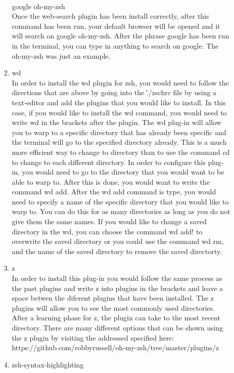 \documentclass{article}
\begin{document}
\begin{enumerate}
\begin{enumerate}
\begin{enumerate}
\\
google oh-my-zsh
\\
Once the web-search plugin has been install correctly, after this command has been run, your default browser will be opened and it will search on google oh-my-zsh. After the phrase google has been run in the terminal, you can type in anything to search on google. The oh-my-zsh was just an example.
\\
\item wd
\\
In order to install the wd plugin for zsh, you would need to follow the directions that are above by going into the \~./zschrc file by using a text-editor and add the plugins that you would like to install. In this case, if you would like to install the wd command, you would need to write wd in the brackets after the plugin. The wd plug-in will allow you to warp to a specific directory that has already been specific and the terminal will go to the specified directory already. This is a much more efficient way to change to directory than to use the command cd to change to each different directory. In order to configure this plug-in, you would need to go to the directory that you would want to be able to warp to. After this is done, you would want to write the command wd add. After the wd add command is type, you would need to specify a name of the specific directory that you would like to warp to. You can do this for as many directories as long as you do not give them the same names. If you would like to change a saved directory in the wd, you can choose the command wd add! to overwrite the saved directory or you could use the command wd rm, and the name of the saved directory to remove the saved directorty. 
\\
\item z
\\
In order to install this plug-in you would follow the same process as the past plugins and write z into plugins in the brackets and leave a space betwen the diferent plugins that have been installed. The z plugins will allow you to see the most commonly used directories. After a learning phase for z, the plugin can take to the most recent directory. There are many different options that can be shown using the z plugin by visiting the addressed specified here:
\\
https://github.com/robbyrussell/oh-my-zsh/tree/master/plugins/z
\\
\item zsh-syntax-highlighting
\\

\end{enumerate}
\end{enumerate}
\end{enumerate}
\end{document}
